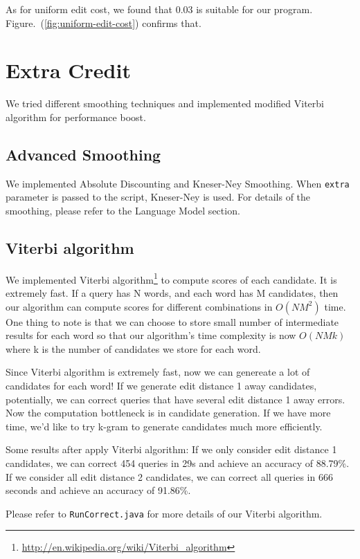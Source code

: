 \documentclass{article}
\begin{document}
As for uniform edit cost, we found that 0.03 is suitable for our program. Figure.~(\ref{fig:uniform-edit-cost}) confirms that.

\section{Extra Credit}

We tried different smoothing techniques and implemented modified Viterbi algorithm for performance boost.

\subsection{Advanced Smoothing}

We implemented Absolute Discounting and Kneser-Ney Smoothing. When \texttt{extra} parameter is passed to the script, Kneser-Ney is used. For details of the smoothing, please refer to the Language Model section.

\subsection{Viterbi algorithm}

We implemented Viterbi algorithm\footnote{\url{http://en.wikipedia.org/wiki/Viterbi\_algorithm}} to compute scores of each candidate. It is extremely fast. If a query has N words, and each word has M candidates, then our algorithm can compute scores for different combinations in $O(NM^2)$ time. One thing to note is that we can choose to store small number of intermediate results for each word so that our algorithm's time complexity is now $O(NMk)$ where k is the number of candidates we store for each word.

Since Viterbi algorithm is extremely fast, now we can genereate a lot of candidates for each word! If we generate edit distance 1 away candidates, potentially, we can correct queries that have several edit distance 1 away errors. Now the computation bottleneck is in candidate generation. If we have more time, we'd like to try k-gram to generate candidates much more efficiently.

Some results after apply Viterbi algorithm: If we only consider edit distance 1 candidates, we can correct 454 queries in 29s and achieve an accuracy of 88.79\%. If we consider all edit distance 2 candidates, we can correct all queries in 666 seconds and achieve an accuracy of 91.86\%.

Please refer to \texttt{RunCorrect.java} for more details of our Viterbi algorithm.
\end{document}
